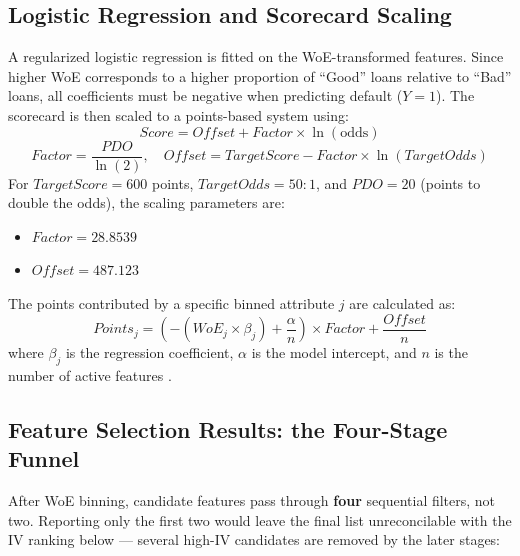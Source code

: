 \documentclass[11pt,a4paper]{article}
\begin{document}
\subsection{Logistic Regression and Scorecard Scaling}
A regularized logistic regression \parencite{hosmer2013} is fitted on the WoE-transformed features. Since higher WoE corresponds to a higher proportion of ``Good'' loans relative to ``Bad'' loans, all coefficients must be negative when predicting default ($Y=1$). The scorecard is then scaled to a points-based system using:
\begin{equation}
Score = Offset + Factor \times \ln(\text{odds})
\end{equation}
\begin{equation}
Factor = \frac{PDO}{\ln(2)}, \quad Offset = TargetScore - Factor \times \ln(TargetOdds)
\end{equation}
For $TargetScore = 600$ points, $TargetOdds = 50:1$, and $PDO = 20$ (points to double the odds), the scaling parameters are:
\begin{itemize}
    \item $Factor = 28.8539$
    \item $Offset = 487.123$
\end{itemize}
The points contributed by a specific binned attribute $j$ are calculated as:
\begin{equation}
Points_j = \left( -(WoE_j \times \beta_j) + \frac{\alpha}{n} \right) \times Factor + \frac{Offset}{n}
\end{equation}
where $\beta_j$ is the regression coefficient, $\alpha$ is the model intercept, and $n$ is the number of active features \parencite[Ch.~5]{anderson2007}.

\subsection{Feature Selection Results: the Four-Stage Funnel}
After WoE binning, candidate features pass through \textbf{four} sequential filters, not two. Reporting only the first two would leave the final list unreconcilable with the IV ranking below --- several high-IV candidates are removed by the later stages:
\end{document}
